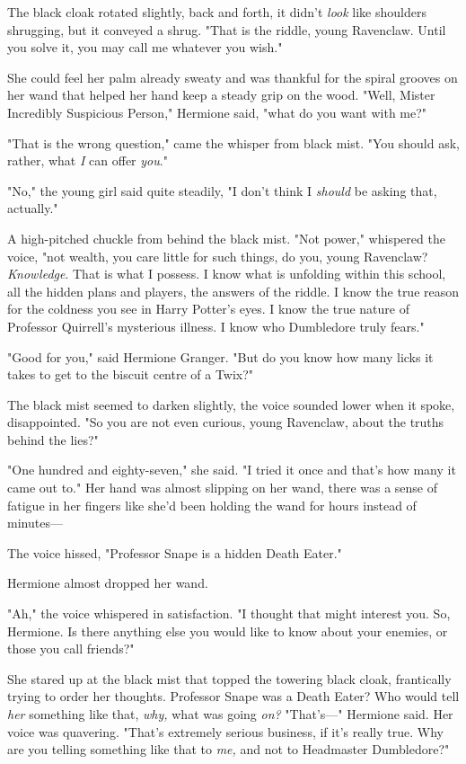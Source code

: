 The black cloak rotated slightly, back and forth, it didn't \emph{look} like
shoulders shrugging, but it conveyed a shrug. "That is the riddle, young
Ravenclaw. Until you solve it, you may call me whatever you wish."

She could feel her palm already sweaty and was thankful for the spiral grooves
on her wand that helped her hand keep a steady grip on the wood. "Well, Mister
Incredibly Suspicious Person," Hermione said, "what do you want with me?"

"That is the wrong question," came the whisper from black mist. "You should
ask, rather, what \emph{I} can offer \emph{you}."

"No," the young girl said quite steadily, "I don't think I \emph{should} be
asking that, actually."

A high-pitched chuckle from behind the black mist. "Not power," whispered the
voice, "not wealth, you care little for such things, do you, young Ravenclaw?
\emph{Knowledge}. That is what I possess. I know what is unfolding within this
school, all the hidden plans and players, the answers of the riddle. I know the
true reason for the coldness you see in Harry Potter's eyes. I know the true
nature of Professor Quirrell's mysterious illness. I know who Dumbledore truly
fears."

"Good for you," said Hermione Granger. "But do you know how many licks it takes
to get to the biscuit centre of a Twix?"

The black mist seemed to darken slightly, the voice sounded lower when it
spoke, disappointed. "So you are not even curious, young Ravenclaw, about the
truths behind the lies?"

"One hundred and eighty-seven," she said. "I tried it once and that's how many
it came out to." Her hand was almost slipping on her wand, there was a sense of
fatigue in her fingers like she'd been holding the wand for hours instead of
minutes---

The voice hissed, "Professor Snape is a hidden Death Eater."

Hermione almost dropped her wand.

"Ah," the voice whispered in satisfaction. "I thought that might interest you.
So, Hermione. Is there anything else you would like to know about your enemies,
or those you call friends?"

She stared up at the black mist that topped the towering black cloak,
frantically trying to order her thoughts. Professor Snape was a Death Eater?
Who would tell \emph{her} something like that, \emph{why,} what was going
\emph{on?} "That's---" Hermione said. Her voice was quavering. "That's
extremely serious business, if it's really true. Why are you telling something
like that to \emph{me,} and not to Headmaster Dumbledore?"

